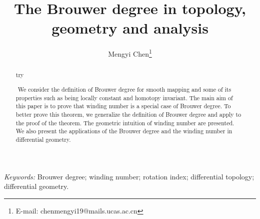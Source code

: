\documentclass[11pt]{article}
\numberwithin{equation}{section} \numberwithin{theorem}{section}
\numberwithin{lemma}{section} \numberwithin{remark}{section}
\numberwithin{table}{section} \numberwithin{corollary}{section}
\numberwithin{example}{section} \numberwithin{conjecture}{section}
\numberwithin{assumption}{section}
\numberwithin{definition}{section}
\numberwithin{proposition}{section}
\begin{document}
\title{The Brouwer degree in topology, geometry and analysis}

\author[1]{Mengyi Chen\thanks{E-mail: chenmengyi19@mails.ucas.ac.cn}}

\maketitle
\begin{abstract}

try

​    We consider the definition of Brouwer degree for smooth mapping and some of its properties such as being locally constant and homotopy invariant. The main aim of this paper is to prove that winding number is a special case of Brouwer degree. To better prove this theorem, we generalize the definition of Brouwer degree and apply to the proof of the theorem. The geometric intuition of winding number are presented. 
​    We also present the applications of the Brouwer degree and the winding number in differential geometry.
\end{abstract}

\emph{Keywords:}
Brouwer degree; winding number; rotation index; differential topology; differential geometry.
\end{document}
